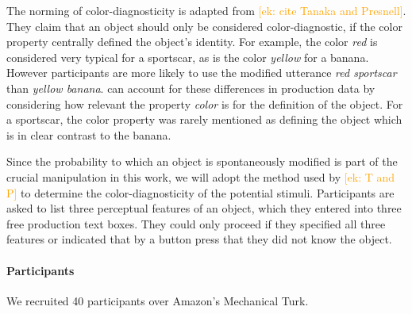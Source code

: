 \documentclass[a4paper,man,floatsintext,natbib,donotrepeattitle]{apa6}
\newcommand{\ek}[1]{\textcolor{Orange}{[ek: #1]}}
\begin{document}







The norming of color-diagnosticity is adapted from \ek{cite Tanaka and Presnell}. They claim that an object should only be considered color-diagnostic, if the color property centrally defined the object's identity. For example, the color \textit{red} is considered very typical for a sportscar, as is the color \textit{yellow} for a banana. However participants are more likely to use the modified utterance \textit{red sportscar} than \textit{yellow banana}. \cite{Tanaka:1999} can account for these differences in production data by considering how relevant the property \textit{color} is for the definition of the object. For a sportscar, the color property was rarely mentioned as defining the object which is in clear contrast to the banana.

Since the probability to which an object is spontaneously modified is part of the crucial manipulation in this work, we will adopt the method used by \ek{T and P} to determine the color-diagnosticity of the potential stimuli. Participants are asked to list three perceptual features of an object, which they entered into three free production text boxes. They could only proceed if they specified all three features or indicated that by a button press that they did not know the object.

\paragraph{Participants}
We recruited 40 participants over Amazon's Mechanical Turk.
\end{document}
